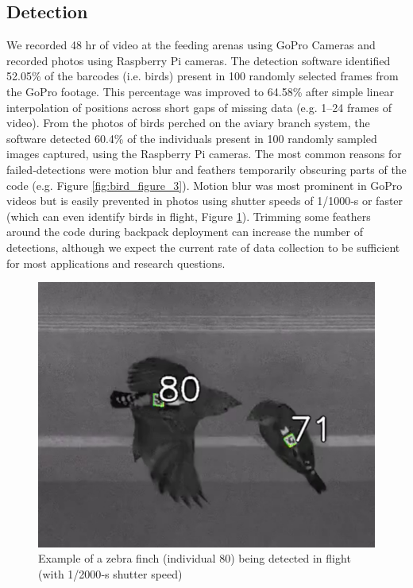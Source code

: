 \documentclass[11pt,a4paper,oneside]{book}
\begin{document}
\begin{doublespace}
\subsection{Detection}
We recorded 48 hr of video at the feeding arenas using GoPro Cameras and recorded photos using Raspberry Pi cameras. The detection software identified 52.05\% of the barcodes (i.e. birds) present in 100 randomly selected frames from the GoPro footage. This percentage was improved to 64.58\% after simple linear interpolation of positions across short gaps of missing data (e.g. 1–24 frames of video). From the photos of birds perched on the aviary branch system, the software detected 60.4\% of the individuals present in 100 randomly sampled images captured, using the Raspberry Pi cameras. The most common reasons for failed‐detections were motion blur and feathers temporarily obscuring parts of the code (e.g. Figure \ref{fig:bird_figure_3}). Motion blur was most prominent in GoPro videos but is easily prevented in photos using shutter speeds of 1/1000‐s or faster (which can even identify birds in flight, Figure \ref{fig:bird_figure_6}). Trimming some feathers around the code during backpack deployment can increase the number of detections, although we expect the current rate of data collection to be sufficient for most applications and research questions.

\begin{figure}[!htb]
    \centering
    \includegraphics{Graving_IMPRS_Thesis/figures/bird_figure_6.jpg}
    \caption{Example of a zebra finch (individual 80) being detected in flight (with 1/2000‐s shutter speed)
}
    \label{fig:bird_figure_6}
\end{figure}

\end{doublespace}
\end{document}
